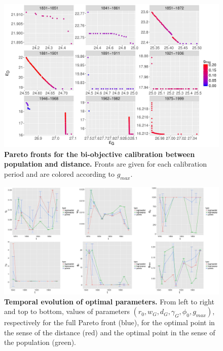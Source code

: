 \documentclass[11pt]{article}
\begin{document}
\begin{figure}
	\includegraphics[width=\linewidth]{6-2-3-fig-macrocoevol-pareto.jpg}
	\caption[Pareto fronts for the calibration on population and distance]{\textbf{Pareto fronts for the bi-objective calibration between population and distance.} Fronts are given for each calibration period and are colored according to $g_{max}$.\label{fig:macrocoevol:pareto}}
\end{figure}




\begin{figure}
	\includegraphics[width=\linewidth]{6-2-3-fig-macrocoevol-parameters.jpg}
	\caption[Evolution of calibrated parameters]{\textbf{Temporal evolution of optimal parameters.} From left to right and top to bottom, values of parameters $(r_0,w_G,d_G,\gamma_G,\phi_0,g_{max})$, respectively for the full Pareto front (blue), for the optimal point in the sense of the distance (red) and the optimal point in the sense of the population (green). \label{fig:macrocoevol:parameters}}
\end{figure}
\end{document}
